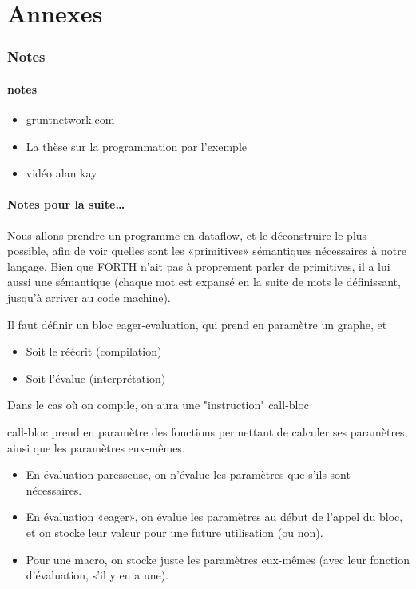 \documentclass{article}
\begin{document}
\appendix

\part{Annexes}
\section{Notes}
\subsection{notes}
\begin{itemize}
\item gruntnetwork.com
\item La thèse sur la programmation par l'exemple
\item vidéo alan kay
\end{itemize}

\subsection{Notes pour la suite\dots}




Nous allons prendre un programme en dataflow, et le déconstruire le plus possible, afin de voir quelles sont les «primitives» sémantiques nécessaires à notre langage. Bien que FORTH n'ait pas à proprement parler de primitives, il a lui aussi une sémantique (chaque mot est expansé en la suite de mots le définissant, jusqu'à arriver au code machine).
  

Il faut définir un bloc eager-evaluation, qui prend en paramètre un graphe, et
\begin{itemize}
\item Soit le réécrit (compilation)
\item Soit l'évalue (interprétation)
\end{itemize}
Dans le cas où on compile, on aura une "instruction" call-bloc

call-bloc prend en paramètre des fonctions permettant de calculer ses paramètres, ainsi que les paramètres eux-mêmes.
\begin{itemize}
\item En évaluation paresseuse, on n'évalue les paramètres que s'ils sont nécessaires.
\item En évaluation «eager», on évalue les paramètres au début de l'appel du bloc, et on stocke leur valeur pour une future utilisation (ou non).
\item Pour une macro, on stocke juste les paramètres eux-mêmes (avec leur fonction d'évaluation, s'il y en a une).
\end{itemize}


\nocite{*}


\end{document}
